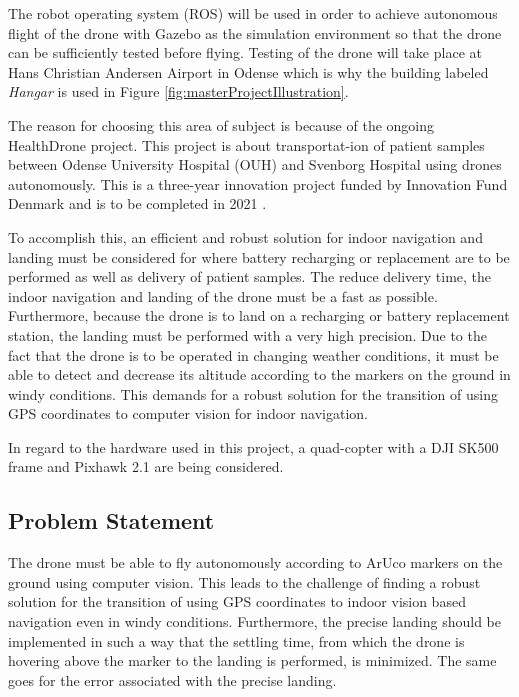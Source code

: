 \documentclass[../Head/Report.tex]{subfiles}
\begin{document}
The robot operating system (ROS) will be used in order to achieve autonomous flight of the drone with Gazebo as the simulation environment so that the drone can be sufficiently tested before flying. Testing of the drone will take place at Hans Christian Andersen Airport in Odense which is why the building labeled \textit{Hangar} is used in Figure \ref{fig:masterProjectIllustration}.   


The reason for choosing this area of subject is because of the ongoing HealthDrone project. This project is about transportat-ion of patient samples between Odense University Hospital (OUH) and Svenborg Hospital using drones autonomously. This is a three-year innovation project funded by Innovation Fund Denmark and is to be completed in 2021 \cite{HealthDrone}. 

To accomplish this, an efficient and robust solution for indoor navigation and landing must be considered for where battery recharging or replacement are to be performed as well as delivery of patient samples. The reduce delivery time, the indoor navigation and landing of the drone must be a fast as possible. Furthermore, because the drone is to land on a recharging or battery replacement station, the landing must be performed with a very high precision. Due to the fact that the drone is to be operated in changing weather conditions, it must be able to detect and decrease its altitude according to the markers on the ground in windy conditions. This demands for a robust solution for the transition of using GPS coordinates to computer vision for indoor navigation.



In regard to the hardware used in this project, a quad-copter with a DJI SK500 frame and Pixhawk 2.1 are being considered.   



\subsection{Problem Statement}

The drone must be able to fly autonomously according to ArUco markers on the ground using computer vision. This leads to the challenge of finding a robust solution for the transition of using GPS coordinates to indoor vision based navigation even in windy conditions. Furthermore, the precise landing should be implemented in such a way that the settling time, from which the drone is hovering above the marker to the landing is performed, is minimized. The same goes for the error associated with the precise landing.  
\end{document}
